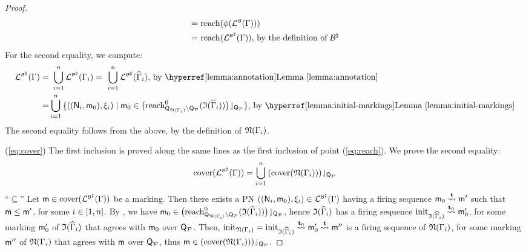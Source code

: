 \begin{textAtEnd}[category=proofs]
\begin{proof}
\begin{align*}
    = & ~\mathrm{reach}({\phi({\mathcal{L}_{}^{\scriptscriptstyle{\mathcal{B}}}({\Gamma})})}) \\
    = & ~\mathrm{reach}({\mathcal{L}_{}^{\scriptscriptstyle{{\mathcal{B}}^\sharp}}({\Gamma})}) \text{, by the definition of ${\mathcal{B}}^\sharp$}
  \end{align*}
  For the second equality, we compute:
  \begin{align*}
    \alangof{}{\absof{\algof{B}}}{\grammar} = & ~\bigcup_{i=1}^n \alangof{}{\absof{\algof{B}}}{\grammar_i} =
    ~\bigcup_{i=1}^n \alangof{}{\absof{\algof{B}}}{\widehat{\grammar}_i} \text{, by \lemref{lemma:annotation}} \\
    = & \bigcup_{i=1}^n \set{((\anet_i,\amark_0),\sources_i) \mid \amark_0 \in \proj{\big(\zreach{\placeof{\foldpn{\grammar_i}} \setminus \placeof{\ptypes}}{\initof{\widehat{\grammar}_i}}\big)}{\placeof{\ptypes}}}
    \text{, by \lemref{lemma:initial-markings}}
  \end{align*}
  The second equality follows from the above, by the definition of
  $\mathfrak{N}({\Gamma_i})$.

  \vspace*{\baselineskip}
  \noindent(\ref{eq:cover}) The first inclusion is proved along the
  same lines as the first inclusion of point (\ref{eq:reach}). We
  prove the second equality:
  \[\mathrm{cover}({\mathcal{L}_{}^{\scriptscriptstyle{{\mathcal{B}}^\sharp}}({\Gamma})}) = \bigcup_{i=1}^n {\left(\mathrm{cover}({\mathfrak{N}({\Gamma_i})})\right)}\!\downharpoonleft_{\mathsf{Q}_{\mathcal{P}}}\]
  \noindent``$\subseteq$'' Let $\mathsf{m} \in
  \mathrm{cover}({\mathcal{L}_{}^{\scriptscriptstyle{{\mathcal{B}}^\sharp}}({\Gamma})})$ be a marking. Then
  there exists a PN $((\mathsf{N}_i,\mathsf{m}_0),\xi_i) \in
  \mathcal{L}_{}^{\scriptscriptstyle{{\mathcal{B}}^\sharp}}({\Gamma})$ having a firing sequence
  $\mathsf{m}_0 \stackrel{\mathbf{t}}{\leadsto} \mathsf{m}'$ such that $\mathsf{m} \leq \mathsf{m}'$,
  for some $i \in {[{1},{n}]}$. By ,
  we have $\mathsf{m}_0 \in
  {\big(\mathrm{reach}^0_{\mathsf{Q}_{\mathfrak{N}({\Gamma_i})} \setminus
      \mathsf{Q}_{\mathcal{P}}}({\mathfrak{I}({\widehat{\Gamma}_i})})\big)}\!\downharpoonleft_{\mathsf{Q}_{\mathcal{P}}}$,
  hence $\mathfrak{I}({\widehat{\Gamma}_i})$ has a firing sequence
  $\mathrm{init}_{\mathfrak{I}({\widehat{\Gamma}_i})} \stackrel{\mathbf{t}_0}{\leadsto}
  \mathsf{m}'_0$, for some marking $\mathsf{m}'_0$ of
  $\mathfrak{I}({\widehat{\Gamma}_i})$ that agrees with $\mathsf{m}_0$ over
  $\mathsf{Q}_{\mathcal{P}}$. Then,
  $\mathrm{init}_{\mathfrak{N}({\Gamma_i})} = \mathrm{init}_{\mathfrak{I}({\widehat{\Gamma}_i})} \stackrel{\mathbf{t}_0}{\leadsto}
  \mathsf{m}'_0 \stackrel{\mathbf{t}}{\leadsto} \mathsf{m}''$ is a firing sequence of
  $\mathfrak{N}({\Gamma_i})$, for some marking $\mathsf{m}''$ of
  $\mathfrak{N}({\Gamma_i})$ that agrees with $\mathsf{m}$ over
  $\mathsf{Q}_{\mathcal{P}}$, thus
  $\mathsf{m}\in{\left(\mathrm{cover}({\mathfrak{N}({\Gamma_i})})\right)}\!\downharpoonleft_{\mathsf{Q}_{\mathcal{P}}}$.


\end{proof}
\end{textAtEnd}
